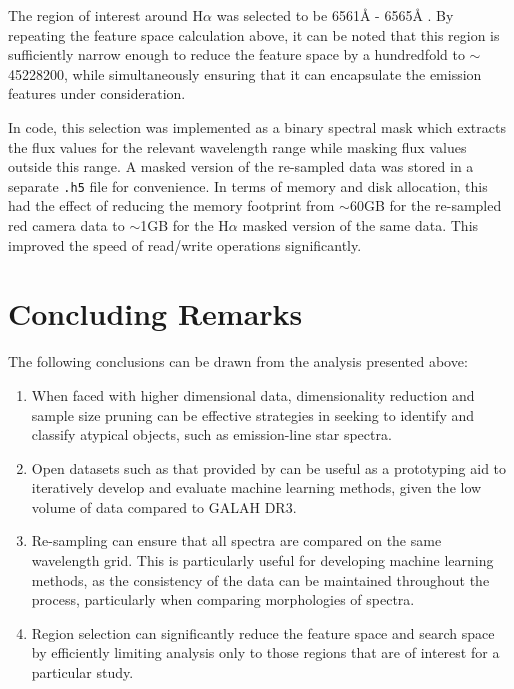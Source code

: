 The region of interest around H$\alpha$ was selected to be 6561\r{A} - 6565\r{A} \citep{traven2017galah}. By repeating the feature space calculation above, it can be noted that this region is sufficiently narrow enough to reduce the feature space by a hundredfold to $\sim$ \num[round-precision=2,round-mode=figures, scientific-notation=true]{45228200}, while simultaneously ensuring that it can encapsulate the emission features under consideration. 

In code, this selection was implemented as a binary spectral mask which extracts the flux values for the relevant wavelength range while masking flux values outside this range. A masked version of the re-sampled data was stored in a separate \texttt{.h5} file for convenience. In terms of memory and disk allocation, this had the effect of reducing the memory footprint from $\sim$60GB for the re-sampled red camera data to $\sim$1GB for the H$\alpha$ masked version of the same data. This improved the speed of read/write operations significantly. 

\section{Concluding Remarks}

The following conclusions can be drawn from the analysis presented above:

\begin{enumerate}
\item When faced with higher dimensional data, dimensionality reduction and sample size pruning can be effective strategies in seeking to identify and classify atypical objects, such as emission-line star spectra. 

\item Open datasets such as that provided by \citet{vcotar2021galah} can be useful as a prototyping aid to iteratively develop and evaluate machine learning methods, given the low volume of data compared to GALAH DR3. 

\item Re-sampling can ensure that all spectra are compared on the same wavelength grid. This is particularly useful for developing machine learning methods, as the consistency of the data can be maintained throughout the process, particularly when comparing morphologies of spectra.  

\item Region selection can significantly reduce the feature space and search space by efficiently limiting analysis only to those regions that are of interest for a particular study. 
\end{enumerate}

